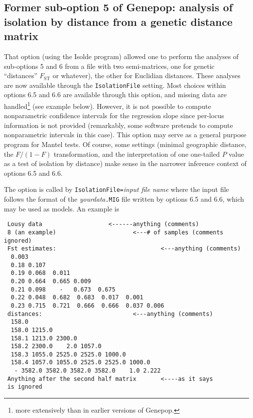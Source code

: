 \documentclass[
  12pt,
]{book}
\begin{document}
\hypertarget{former-sub-option-5-of-genepop-analysis-of-isolation-by-distance-from-a-genetic-distance-matrix}{%
\subsection{Former sub-option 5 of Genepop: analysis of isolation by distance from a genetic distance matrix}\label{former-sub-option-5-of-genepop-analysis-of-isolation-by-distance-from-a-genetic-distance-matrix}}

That option (using the Isolde program) allowed one to perform the analyses of sub-options 5 and 6 from a file with two semi-matrices, one for genetic ``distances'' \(F_{\mathrm{ST}}\) or whatever), the other for Euclidian distances. These analyses are now available through the \texttt{IsolationFile} setting. Most choices within options 6.5 and 6.6 are available through this option, and missing data are handled\footnote{more extensively than in earlier versions of Genepop.} (see example below). However, it is not possible to compute nonparametric confidence intervals for the regression slope since per-locus information is not provided (remarkably, some software pretends to compute nonparametric intervals in this case). This option may serve as a general purpose program for Mantel tests. Of course, some settings (minimal geographic distance, the \(F/(1-F)\) transformation, and the interpretation of one one-tailed \(P\) value as a test of isolation by distance) make sense in the narrower inference context of options 6.5 and 6.6.

The option is called by \texttt{IsolationFile=}\emph{input file name} where the input file follows the format of the \emph{yourdata}\texttt{.MIG} file written by options 6.5 and 6.6, which may be used as models. An example is

\begin{verbatim}
 Lousy data                   <------anything (comments)
 8 (an example)                      <---# of samples (comments ignored)
 Fst estimates:                              <---anything (comments)
  0.003
  0.18 0.107
  0.19 0.068  0.011
  0.20 0.664  0.665 0.009
  0.21 0.098    -   0.673  0.675
  0.22 0.048  0.682  0.683  0.017  0.001
  0.23 0.715  0.721  0.666  0.666  0.037 0.006
 distances:                          <---anything (comments)
  158.0
  158.0 1215.0
  158.1 1213.0 2300.0
  158.2 2300.0    2.0 1057.0
  158.3 1055.0 2525.0 2525.0 1000.0
  158.4 1057.0 1055.0 2525.0 2525.0 1000.0
   - 3582.0 3582.0 3582.0 3582.0    1.0 2.222
 Anything after the second half matrix       <----as it says
 is ignored
\end{verbatim}
\end{document}
